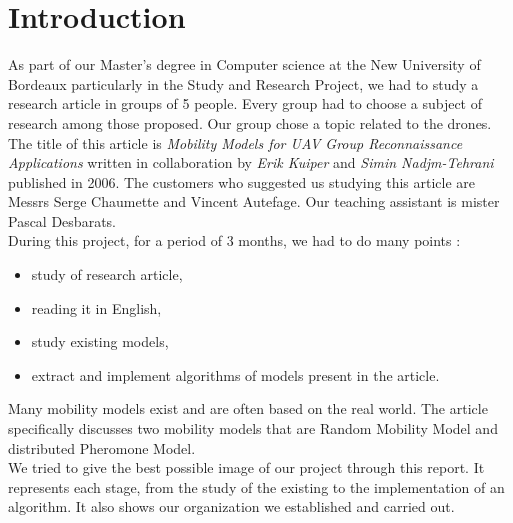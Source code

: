 \chapter*{Introduction}

As part of our Master's degree in Computer science at the New University of Bordeaux particularly in the Study and Research Project, we had to study a research article in groups of 5 people. Every group had to choose a subject of research among those proposed. Our group chose a topic related to the drones. The title of this article is \textit{Mobility Models for UAV Group Reconnaissance Applications} written in collaboration by \textit{Erik Kuiper} and \textit{Simin Nadjm-Tehrani} published in 2006. The customers who suggested us studying this article are Messrs Serge Chaumette and Vincent Autefage. Our teaching assistant is mister Pascal Desbarats.\\

During this project, for a period of 3 months, we had to do many points :
\begin{itemize}
\item study of research article,
\item reading it in English,
\item study existing models,
\item extract and implement algorithms of models present in the article.
\end{itemize}

Many mobility models exist and are often based on the real world.
The article specifically discusses two mobility models that are Random Mobility Model and distributed Pheromone Model.\\

We tried to give the best possible image of our project through this report. It represents each stage, from the study of the existing to the implementation of an algorithm. It also shows our organization we established and carried out. 
